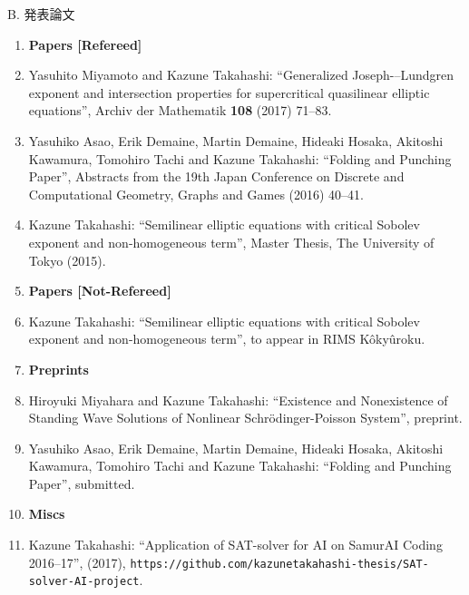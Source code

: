 \documentclass[a4j,twocolumn]{jarticle}
\begin{document}
\vspace{0.2cm}

\noindent B. 発表論文

\vspace{0.1cm}


\begin{enumerate}
 \item[] {\bf Papers [Refereed]}
 \item Yasuhito Miyamoto and Kazune Takahashi: ``Generalized
       Joseph-–Lundgren exponent and intersection properties for
       supercritical quasilinear elliptic equations'',
       Archiv der Mathematik {\bf 108} (2017) 71--83. 
 \item Yasuhiko Asao, Erik Demaine, Martin Demaine, Hideaki Hosaka,
       Akitoshi Kawamura, Tomohiro Tachi and Kazune Takahashi:
       ``Folding and Punching Paper'', Abstracts from the 19th Japan
       Conference on Discrete and Computational Geometry, Graphs and
       Games (2016) 40--41.
 \item Kazune Takahashi: ``Semilinear elliptic equations with critical
       Sobolev exponent and non-homogeneous term'',
       Master Thesis, The University of Tokyo (2015).
 \item[] {\bf Papers [Not-Refereed]}
 \item Kazune Takahashi: ``Semilinear elliptic equations with
       critical Sobolev exponent and non-homogeneous term'',
       to appear in RIMS K\^{o}ky\^{u}roku.
 \item[] {\bf Preprints}
 \item Hiroyuki Miyahara and Kazune Takahashi: ``Existence and
       Nonexistence of Standing Wave Solutions of 
       Nonlinear Schr\"{o}dinger-Poisson System'', preprint.
 \item Yasuhiko Asao, Erik Demaine, Martin Demaine, Hideaki Hosaka,
       Akitoshi Kawamura, Tomohiro Tachi and Kazune Takahashi:
       ``Folding and Punching Paper'', submitted.
 \item[] {\bf Miscs}
 \item Kazune Takahashi: ``Application of SAT-solver for AI on SamurAI
       Coding 2016--17'', (2017),
       {\tt https:\slash\slash{}github.com\slash{}kazunetakahashi-thesis\slash{}SAT-solver-AI-project}.
\end{enumerate}
\end{document}
